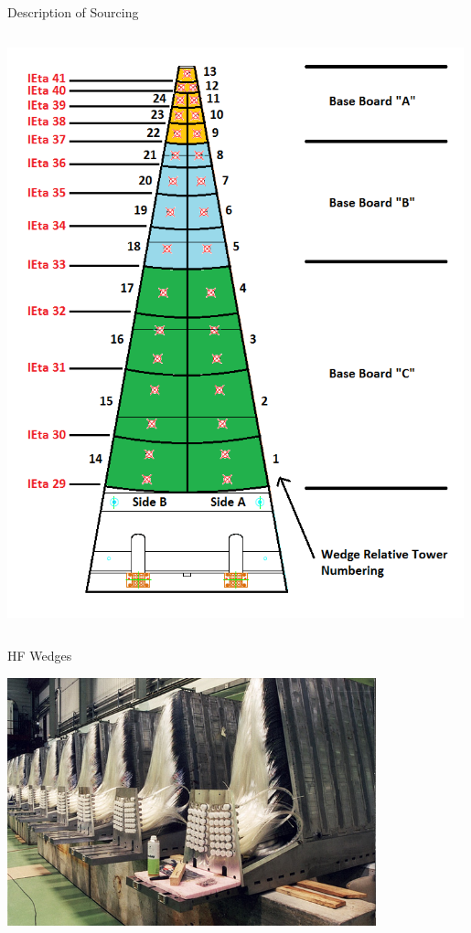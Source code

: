 \documentclass[pdf, 9pt]{beamer}
\begin{document}
\begin{frame}{Description of Sourcing}
\begin{columns}[T]
\begin{column}{0.35\textwidth}
        \includegraphics[width=0.99\textwidth, height=0.7\textheight]{figs/hf/HFWedge.png}
      \end{column}
    \end{columns}
  \end{frame}

  \begin{frame}{HF Wedges}
    \begin{center}
      \includegraphics[width=0.8\textwidth, height=0.8\textheight]{figs/hf/Calorimeter_Wedges.jpg}
    \end{center}
  \end{frame}
\end{document}
